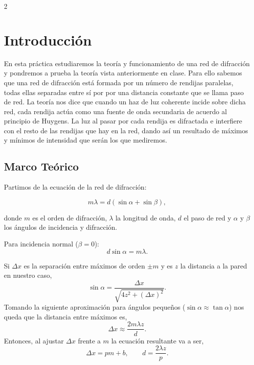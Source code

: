 \documentclass[12pt,a4paper]{article}
\begin{document}
\begin{multicols}{2}

\section{Introducción}

En esta práctica estudiaremos la teoría y funcionamiento de una red de difracción y pondremos a prueba la teoría vista anteriormente en clase. Para ello sabemos que una red de difracción está formada por un número de rendijas paralelas, todas ellas separadas entre sí por por una distancia constante que se llama paso de red. La teoría nos dice que cuando un haz de luz coherente incide sobre dicha red, cada rendija actúa como una fuente de onda secundaria de acuerdo al principio de Huygens. La luz al pasar por cada rendija es difractada e interfiere con el resto de las rendijas que hay en la red, dando así un resultado de máximos y mínimos de intensidad que serán los que mediremos.



\subsection{Marco Teórico}

Partimos de la ecuación de la red de difracción:

\begin{equation}
    m\lambda = d(\sin\alpha + \sin\beta),
    \label{eq:newport_general}
\end{equation}

donde $m$ es el orden de difracción, $\lambda$ la longitud de onda, $d$ el paso de red y $\alpha$ y $\beta$ los ángulos de incidencia y difracción.

Para incidencia normal ($\beta=0$):
\begin{equation}
    d\sin\alpha=m\lambda.
    \label{eq:red_normal}
\end{equation}

Si $\Delta x$ es la separación entre máximos de orden $\pm m$ y es $z$ la distancia a la pared en nuestro caso,
\begin{equation}
    \sin\alpha = \frac{\Delta x}{\sqrt{4z^2+(\Delta x)^2}}.
    \label{eq:sin_exacta}
\end{equation}
Tomando la siguiente aproximación para ángulos pequeños ($\sin\alpha\approx\tan\alpha$) nos queda que la distancia entre máximos es,
\begin{equation}
    \Delta x\approx \frac{2m\lambda z}{d}.
    \label{eq:paraxial}
\end{equation}
Entonces, al ajustar $\Delta x$ frente a $m$ la ecuación resultante va a ser,
\begin{equation}
    \Delta x = pm+b,\qquad d=\frac{2\lambda z}{p}.
    \label{eq:d_pendiente}
\end{equation}


\end{multicols}
\end{document}
